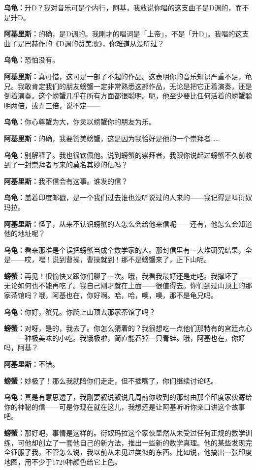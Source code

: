 \documentclass[
  12pt,
  twoside,
  openright,
  oldfontcommands,
]{memoir}
\newcommand{\dialogname}[1]{{\heifamily\bfseries #1}}
\begin{document}
\dialogname{乌龟：}升D？我对音乐可是个内行，阿基，我敢说你唱的这支曲子是D调的，而不是升D。

\dialogname{阿基里斯：}的确，是D调的。我刚才的唱词是「上帝」，不是「升D」。我唱的这支曲子是巴赫作的《D调的赞美歌》，你难道从没听过？

\dialogname{乌龟：}恐怕没有。

\dialogname{阿基里斯：}真可惜，这可是一部了不起的作品。这表明你的音乐知识严重不足，龟兄。我敢肯定我们的朋友螃蟹一定非常熟悉这部作品，无论是把它正着演奏，还是倒着演奏。这个螃蟹几乎在所有方面都很聪明。呃，他至少要比任何活着的螃蟹聪明两倍，或许三倍，说不定------

\dialogname{乌龟：}你心尊蟹为大，你灵以螃蟹你的朋友为乐。

\dialogname{阿基里斯：}的确，我要赞美螃蟹，这是因为我恰好是他的一个崇拜者\ldots\ldots{}

\dialogname{乌龟：}别解释了。我也很钦佩他。说到螃蟹的崇拜者，我跟你说起过螃蟹不久前收到了一封崇拜者写来的莫名其妙的信吗？

\dialogname{阿基里斯：}我不信会有这事。谁发的信？

\dialogname{乌龟：}盖着印度邮戳，是一个我们过去谁也没听说过的人来的------我记得是叫衍奴玛拉。

\dialogname{阿基里斯：}怪了，从来不认识螃蟹的人怎么会给他来信呢------还有，他怎么会知道他的地址呢？

\dialogname{乌龟：}看来那准是个误把螃蟹当成个数学家的人。那封信里有一大堆研究结果，全是------哎，嘿！说到曹操，曹操就到！那不是螃蟹来了，正下山呢。

\dialogname{螃蟹：}再见！很愉快又跟你们聊了一次。哦，我看我最好还是走吧。我撑坏了------无论如何也不能再吃了。我自己刚才就在上面------很值得去。你们到过山顶上的那家茶馆吗？哦，阿基也在，你好啊。哈，哈，噢，噢，那不是龟兄吗。

\dialogname{乌龟：}你好，蟹兄。你爬上山顶去那家茶馆了吗？

\dialogname{螃蟹：}对呀，是的，我去了。你怎么猜着的？我很想吃一点他们那特有的宫廷点心------一种极美味的小吃。我饿极啦，简直能吞掉一只青蛙。哦，阿基也在，你好吗，阿基？

\dialogname{阿基里斯：}不错。

\dialogname{螃蟹：}妙极了！那么我就陪你们走走，但不插嘴了，你们继续讨论吧。

\dialogname{乌龟：}真是有意思透了，我刚要叙说叙说几周前你收到的那封由那个印度家伙寄给你的神秘的信------可是你现在就在这儿，我想还是让阿基听听你亲口讲这个故事吧。

\dialogname{螃蟹：}那好吧，事情是这样的。衍奴玛拉这个家伙显然从未受过任何正规的数学训练，可他却创立了一套他自己的新方法，推出一些新的数学真理。他的某些发现完全征服了我，不管怎么说，我以前从未见过类似的东西。比如说，他搞出一张印度地图，用不少于1729种颜色给它上色。
\end{document}
